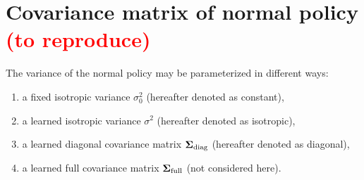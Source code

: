 


%

\section{Covariance matrix of normal policy \textcolor{red}{(to reproduce)}}

The variance of the normal policy may be parameterized in different ways:

\begin{enumerate}
	\item a fixed isotropic variance $\sigma_0^2$ (hereafter denoted as constant),
	\item a learned isotropic variance $\sigma^2$ (hereafter denoted as isotropic),
	\item a learned diagonal covariance matrix $\bm{\Sigma}_\text{diag}$ (hereafter denoted as diagonal),
	\item a learned full covariance matrix $\bm{\Sigma}_\text{full}$ (not considered here).
\end{enumerate}


